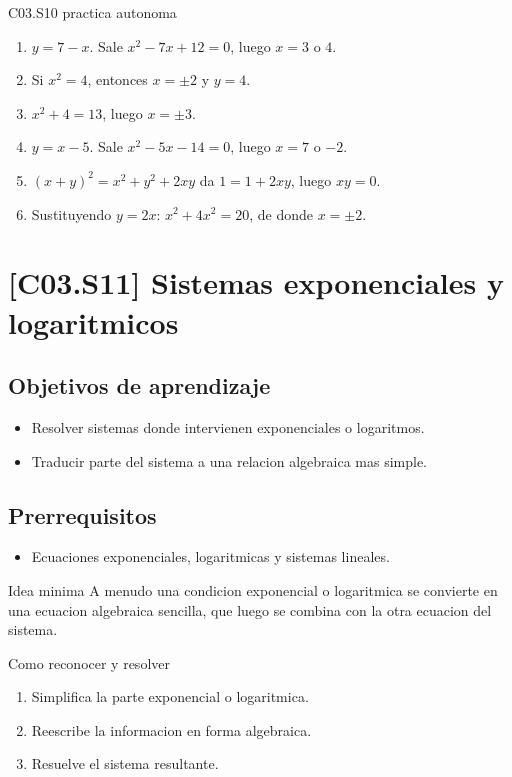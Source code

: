 \begin{fullsolution}{C03.S10 practica autonoma}
\begin{enumerate}[label=\textbf{PX-C03.S10-\arabic*:}, leftmargin=*]
  \item \(y=7-x\). Sale \(x^2-7x+12=0\), luego \(x=3\) o \(4\).
  \item Si \(x^2=4\), entonces \(x=\pm 2\) y \(y=4\).
  \item \(x^2+4=13\), luego \(x=\pm 3\).
  \item \(y=x-5\). Sale \(x^2-5x-14=0\), luego \(x=7\) o \(-2\).
  \item \((x+y)^2=x^2+y^2+2xy\) da \(1=1+2xy\), luego \(xy=0\).
  \item Sustituyendo \(y=2x\): \(x^2+4x^2=20\), de donde \(x=\pm 2\).
\end{enumerate}
\end{fullsolution}

\section{[C03.S11] Sistemas exponenciales y logaritmicos}

\subsection*{Objetivos de aprendizaje}
\begin{itemize}
  \item Resolver sistemas donde intervienen exponenciales o logaritmos.
  \item Traducir parte del sistema a una relacion algebraica mas simple.
\end{itemize}

\subsection*{Prerrequisitos}
\begin{itemize}
  \item Ecuaciones exponenciales, logaritmicas y sistemas lineales.
\end{itemize}

\begin{theorybox}{Idea minima}
A menudo una condicion exponencial o logaritmica se convierte en una ecuacion algebraica
sencilla, que luego se combina con la otra ecuacion del sistema.
\end{theorybox}

\begin{methodbox}{Como reconocer y resolver}
\begin{enumerate}
  \item Simplifica la parte exponencial o logaritmica.
  \item Reescribe la informacion en forma algebraica.
  \item Resuelve el sistema resultante.
\end{enumerate}
\end{methodbox}

